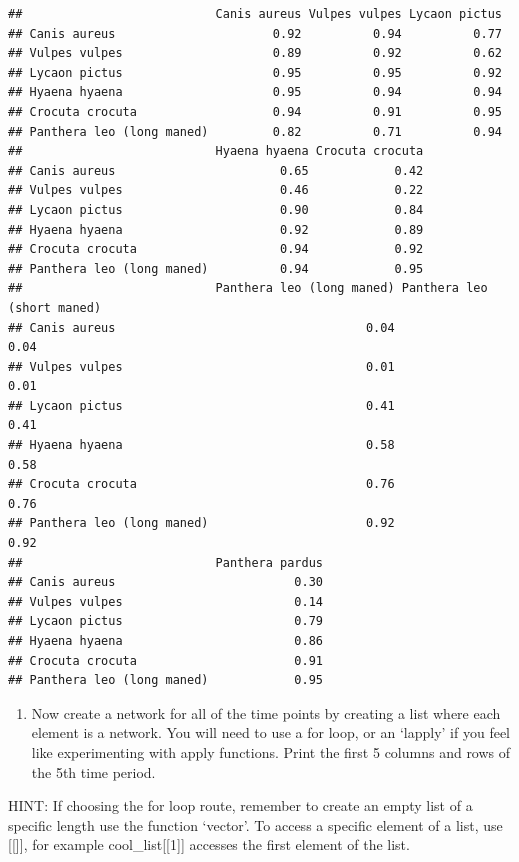 \documentclass[
]{article}
\providecommand{\tightlist}{%
  \setlength{\itemsep}{0pt}\setlength{\parskip}{0pt}}
\begin{document}
\begin{verbatim}
##                           Canis aureus Vulpes vulpes Lycaon pictus
## Canis aureus                      0.92          0.94          0.77
## Vulpes vulpes                     0.89          0.92          0.62
## Lycaon pictus                     0.95          0.95          0.92
## Hyaena hyaena                     0.95          0.94          0.94
## Crocuta crocuta                   0.94          0.91          0.95
## Panthera leo (long maned)         0.82          0.71          0.94
##                           Hyaena hyaena Crocuta crocuta
## Canis aureus                       0.65            0.42
## Vulpes vulpes                      0.46            0.22
## Lycaon pictus                      0.90            0.84
## Hyaena hyaena                      0.92            0.89
## Crocuta crocuta                    0.94            0.92
## Panthera leo (long maned)          0.94            0.95
##                           Panthera leo (long maned) Panthera leo (short maned)
## Canis aureus                                   0.04                       0.04
## Vulpes vulpes                                  0.01                       0.01
## Lycaon pictus                                  0.41                       0.41
## Hyaena hyaena                                  0.58                       0.58
## Crocuta crocuta                                0.76                       0.76
## Panthera leo (long maned)                      0.92                       0.92
##                           Panthera pardus
## Canis aureus                         0.30
## Vulpes vulpes                        0.14
## Lycaon pictus                        0.79
## Hyaena hyaena                        0.86
## Crocuta crocuta                      0.91
## Panthera leo (long maned)            0.95
\end{verbatim}

\begin{enumerate}
\def\labelenumi{\alph{enumi}.}
\setcounter{enumi}{1}
\tightlist
\item
  Now create a network for all of the time points by creating a list
  where each element is a network. You will need to use a for loop, or
  an `lapply' if you feel like experimenting with apply functions. Print
  the first 5 columns and rows of the 5th time period.
\end{enumerate}

HINT: If choosing the for loop route, remember to create an empty list
of a specific length use the function `vector'. To access a specific
element of a list, use {[}{[}{]}{]}, for example cool\_list{[}{[}1{]}{]}
accesses the first element of the list.
\end{document}
